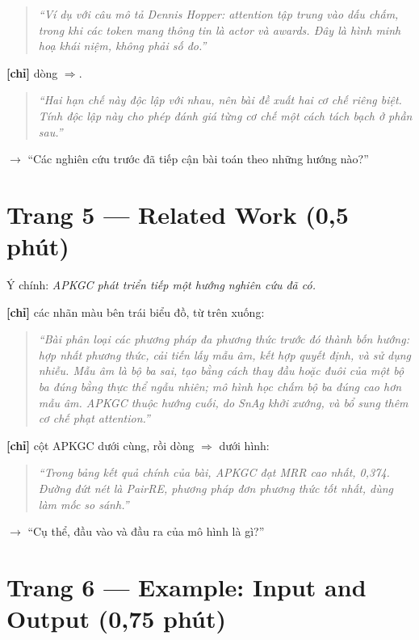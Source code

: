 \documentclass[11pt,a4paper]{article}
\begin{document}
\begin{quote}\itshape ``Ví dụ với câu mô tả Dennis Hopper: attention tập trung vào dấu chấm, trong khi các token mang thông tin là \emph{actor} và \emph{awards}. Đây là hình minh hoạ khái niệm, không phải số đo.''\end{quote}

\textbf{[chỉ]} dòng \ensuremath{\Rightarrow}.


\begin{quote}\itshape ``Hai hạn chế này độc lập với nhau, nên bài đề xuất hai cơ chế riêng biệt. Tính độc lập này cho phép đánh giá từng cơ chế một cách tách bạch ở phần sau.''\end{quote}

\textbf{$\to$} ``Các nghiên cứu trước đã tiếp cận bài toán theo những hướng nào?''


\section*{Trang 5 --- Related Work (0,5 phút)}

Ý chính: \emph{APKGC phát triển tiếp một hướng nghiên cứu đã có.}


\textbf{[chỉ]} các nhãn màu bên trái biểu đồ, từ trên xuống:


\begin{quote}\itshape ``Bài phân loại các phương pháp đa phương thức trước đó thành bốn hướng: hợp nhất phương thức, cải tiến lấy mẫu âm, kết hợp quyết định, và sử dụng nhiễu. Mẫu âm là bộ ba sai, tạo bằng cách thay đầu hoặc đuôi của một bộ ba đúng bằng thực thể ngẫu nhiên; mô hình học chấm bộ ba đúng cao hơn mẫu âm. APKGC thuộc hướng cuối, do SnAg khởi xướng, và bổ sung thêm cơ chế phạt attention.''\end{quote}

\textbf{[chỉ]} cột APKGC dưới cùng, rồi dòng \ensuremath{\Rightarrow} dưới hình:


\begin{quote}\itshape ``Trong bảng kết quả chính của bài, APKGC đạt MRR cao nhất, 0,374. Đường đứt nét là PairRE, phương pháp đơn phương thức tốt nhất, dùng làm mốc so sánh.''\end{quote}

\textbf{$\to$} ``Cụ thể, đầu vào và đầu ra của mô hình là gì?''


\section*{Trang 6 --- Example: Input and Output (0,75 phút)}
\end{document}
